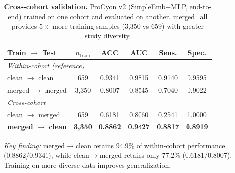 \documentclass[11pt,a4paper]{article}
\begin{document}
\begin{table}[ht]
\centering
\caption{\textbf{Cross-cohort validation.}
ProCyon v2 (SimpleEmb+MLP, end-to-end) trained on one cohort and evaluated on another.
merged\_all provides $5\times$ more training samples (3,350 vs 659) with greater study diversity.}
\label{tab:cross_cohort}
\begin{tabular}{lccccc}
\toprule
\textbf{Train $\rightarrow$ Test} & \textbf{$n_\text{train}$} & \textbf{ACC} & \textbf{AUC} & \textbf{Sens.} & \textbf{Spec.} \\
\midrule
\multicolumn{6}{l}{\textit{Within-cohort (reference)}} \\
\;\; clean $\rightarrow$ clean & 659 & 0.9341 & 0.9815 & 0.9140 & 0.9595 \\
\;\; merged $\rightarrow$ merged & 3,350 & 0.8007 & 0.8545 & 0.7040 & 0.9022 \\
\midrule
\multicolumn{6}{l}{\textit{Cross-cohort}} \\
\;\; clean $\rightarrow$ merged & 659 & 0.6181 & 0.8060 & 0.2541 & 1.0000 \\
\;\; \textbf{merged $\rightarrow$ clean} & \textbf{3,350} & \textbf{0.8862} & \textbf{0.9427} & \textbf{0.8817} & \textbf{0.8919} \\
\bottomrule
\end{tabular}

\vspace{4pt}
\textit{Key finding:} merged$\rightarrow$clean retains 94.9\% of within-cohort performance (0.8862/0.9341),
while clean$\rightarrow$merged retains only 77.2\% (0.6181/0.8007).
Training on more diverse data improves generalization.
\end{table}
\end{document}
